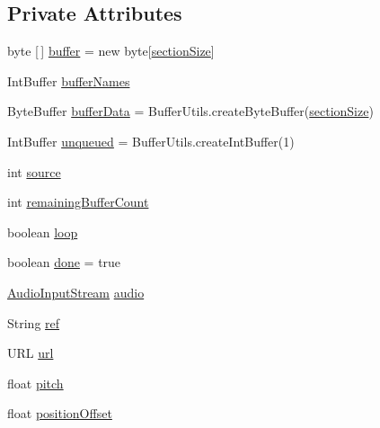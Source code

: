 \subsection*{Private Attributes}
\begin{DoxyCompactItemize}
\item 
byte \mbox{[}$\,$\mbox{]} \mbox{\hyperlink{classorg_1_1newdawn_1_1slick_1_1openal_1_1_open_a_l_stream_player_a43f0da73ce6a383cda06b37d7927f58f}{buffer}} = new byte\mbox{[}\mbox{\hyperlink{classorg_1_1newdawn_1_1slick_1_1openal_1_1_open_a_l_stream_player_a15d60c799362a5a58f98c2b4d9eaeeed}{section\+Size}}\mbox{]}
\item 
Int\+Buffer \mbox{\hyperlink{classorg_1_1newdawn_1_1slick_1_1openal_1_1_open_a_l_stream_player_a97e8e27c6864fcc5abe85728a3e0a60b}{buffer\+Names}}
\item 
Byte\+Buffer \mbox{\hyperlink{classorg_1_1newdawn_1_1slick_1_1openal_1_1_open_a_l_stream_player_a7bbb81d01fec7e276db23218472f642f}{buffer\+Data}} = Buffer\+Utils.\+create\+Byte\+Buffer(\mbox{\hyperlink{classorg_1_1newdawn_1_1slick_1_1openal_1_1_open_a_l_stream_player_a15d60c799362a5a58f98c2b4d9eaeeed}{section\+Size}})
\item 
Int\+Buffer \mbox{\hyperlink{classorg_1_1newdawn_1_1slick_1_1openal_1_1_open_a_l_stream_player_a57522a0a0a5ef27a24b13672a7637174}{unqueued}} = Buffer\+Utils.\+create\+Int\+Buffer(1)
\item 
int \mbox{\hyperlink{classorg_1_1newdawn_1_1slick_1_1openal_1_1_open_a_l_stream_player_abe9f7d1ac52a705aa359cf3eb1c69464}{source}}
\item 
int \mbox{\hyperlink{classorg_1_1newdawn_1_1slick_1_1openal_1_1_open_a_l_stream_player_a071d3388ce422c839a62047c0a966315}{remaining\+Buffer\+Count}}
\item 
boolean \mbox{\hyperlink{classorg_1_1newdawn_1_1slick_1_1openal_1_1_open_a_l_stream_player_a377b3e28ef63fca0134898a07b086e7f}{loop}}
\item 
boolean \mbox{\hyperlink{classorg_1_1newdawn_1_1slick_1_1openal_1_1_open_a_l_stream_player_aacfd7caed9c004b1f0828d8e5bf3e2b2}{done}} = true
\item 
\mbox{\hyperlink{interfaceorg_1_1newdawn_1_1slick_1_1openal_1_1_audio_input_stream}{Audio\+Input\+Stream}} \mbox{\hyperlink{classorg_1_1newdawn_1_1slick_1_1openal_1_1_open_a_l_stream_player_a694870dca2079ff6e6269a394a126d17}{audio}}
\item 
String \mbox{\hyperlink{classorg_1_1newdawn_1_1slick_1_1openal_1_1_open_a_l_stream_player_ab01c1f73849aaeae84d969cbd05d4683}{ref}}
\item 
U\+RL \mbox{\hyperlink{classorg_1_1newdawn_1_1slick_1_1openal_1_1_open_a_l_stream_player_a2f903c9bc54f0a1d739ad917a8aa97f6}{url}}
\item 
float \mbox{\hyperlink{classorg_1_1newdawn_1_1slick_1_1openal_1_1_open_a_l_stream_player_a3841668c39ff3eccf93978ee5ca7bc3e}{pitch}}
\item 
float \mbox{\hyperlink{classorg_1_1newdawn_1_1slick_1_1openal_1_1_open_a_l_stream_player_a41556aeb2058a1c2dd04177e1d61d43c}{position\+Offset}}
\end{DoxyCompactItemize}
